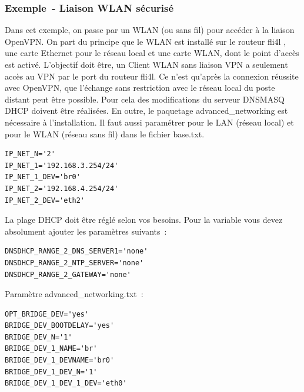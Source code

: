 \subsubsection{Exemple~- Liaison WLAN sécurisé}

Dans cet exemple, on passe par un WLAN (ou sans fil) pour accéder à la liaison
OpenVPN. On part du principe que le WLAN est installé sur le routeur fli4l , une
carte Ethernet pour le réseau local et une carte WLAN, dont le point d'accès est
activé. L'objectif doit être, un Client WLAN sans liaison VPN a seulement accès
au VPN par le port du routeur fli4l. Ce n'est qu'après la connexion réussite
avec OpenVPN, que l'échange sans restriction avec le réseau local du poste
distant peut être possible. Pour cela des modifications du serveur DNSMASQ
DHCP doivent être réalisées. En outre, le paquetage advanced\_networking est
nécessaire à l'installation. Il faut aussi paramétrer  pour
le LAN (réseau local) et  pour le WLAN (réseau sans fil) dans
le fichier base.txt.

\begin{example}
\begin{verbatim}
IP_NET_N='2'
IP_NET_1='192.168.3.254/24'
IP_NET_1_DEV='br0'
IP_NET_2='192.168.4.254/24'
IP_NET_2_DEV='eth2'
\end{verbatim}
\end{example}

La plage DHCP doit être réglé selon vos besoins. Pour la variable 
vous devez absolument ajouter les paramètres suivants~:

\begin{example}
\begin{verbatim}
DNSDHCP_RANGE_2_DNS_SERVER1='none'
DNSDHCP_RANGE_2_NTP_SERVER='none'
DNSDHCP_RANGE_2_GATEWAY='none' 
\end{verbatim}
\end{example}

Paramètre advanced\_networking.txt~:
 
\begin{example}
\begin{verbatim}
OPT_BRIDGE_DEV='yes'
BRIDGE_DEV_BOOTDELAY='yes'
BRIDGE_DEV_N='1'
BRIDGE_DEV_1_NAME='br'
BRIDGE_DEV_1_DEVNAME='br0'
BRIDGE_DEV_1_DEV_N='1'
BRIDGE_DEV_1_DEV_1_DEV='eth0'
\end{verbatim}
\end{example}

